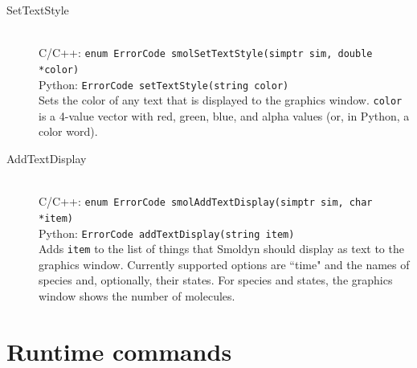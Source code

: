 \documentclass {scrbook}
\newcommand {\ttt} {\texttt}
\begin{document}
\begin{description}
\item[SetTextStyle]
\hfill \\
C/C++: \ttt{enum ErrorCode smolSetTextStyle(simptr sim, double *color)}\\
Python: \ttt{ErrorCode setTextStyle(string color)}\\
Sets the color of any text that is displayed to the graphics window. \ttt{color} is a 4-value vector with red, green, blue, and alpha values (or, in Python, a color word).

\item[AddTextDisplay]
\hfill \\
C/C++: \ttt{enum ErrorCode smolAddTextDisplay(simptr sim, char *item)}\\
Python: \ttt{ErrorCode addTextDisplay(string item)}\\
Adds \ttt{item} to the list of things that Smoldyn should display as text to the graphics window. Currently supported options are ``time" and the names of species and, optionally, their states. For species and states, the graphics window shows the number of molecules.

\end{description}

\section{Runtime commands}
\end{document}
